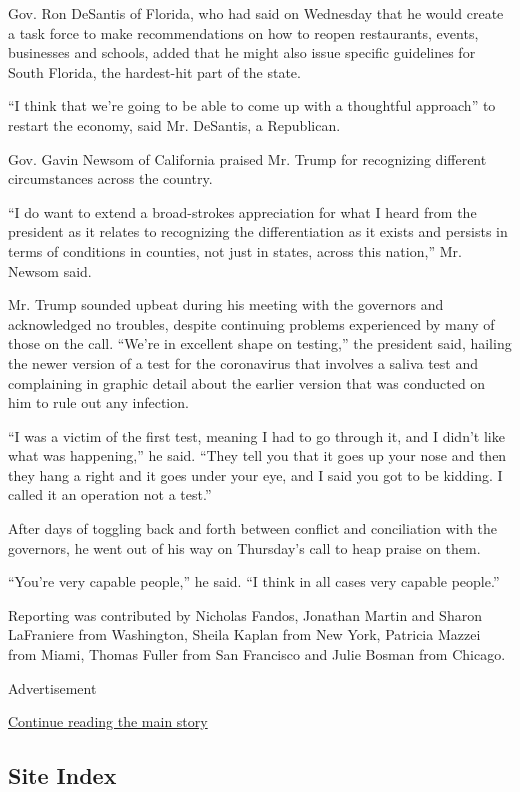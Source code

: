 Gov. Ron DeSantis of Florida, who had said on Wednesday that he would
create a task force to make recommendations on how to reopen
restaurants, events, businesses and schools, added that he might also
issue specific guidelines for South Florida, the hardest-hit part of the
state.

``I think that we're going to be able to come up with a thoughtful
approach'' to restart the economy, said Mr. DeSantis, a Republican.

Gov. Gavin Newsom of California praised Mr. Trump for recognizing
different circumstances across the country.

``I do want to extend a broad-strokes appreciation for what I heard from
the president as it relates to recognizing the differentiation as it
exists and persists in terms of conditions in counties, not just in
states, across this nation,'' Mr. Newsom said.

Mr. Trump sounded upbeat during his meeting with the governors and
acknowledged no troubles, despite continuing problems experienced by
many of those on the call. ``We're in excellent shape on testing,'' the
president said, hailing the newer version of a test for the coronavirus
that involves a saliva test and complaining in graphic detail about the
earlier version that was conducted on him to rule out any infection.

``I was a victim of the first test, meaning I had to go through it, and
I didn't like what was happening,'' he said. ``They tell you that it
goes up your nose and then they hang a right and it goes under your eye,
and I said you got to be kidding. I called it an operation not a test.''

After days of toggling back and forth between conflict and conciliation
with the governors, he went out of his way on Thursday's call to heap
praise on them.

``You're very capable people,'' he said. ``I think in all cases very
capable people.''

Reporting was contributed by Nicholas Fandos, Jonathan Martin and Sharon
LaFraniere from Washington, Sheila Kaplan from New York, Patricia Mazzei
from Miami, Thomas Fuller from San Francisco and Julie Bosman from
Chicago.

Advertisement

\protect\hyperlink{after-bottom}{Continue reading the main story}

\hypertarget{site-index}{%
\subsection{Site Index}\label{site-index}}


